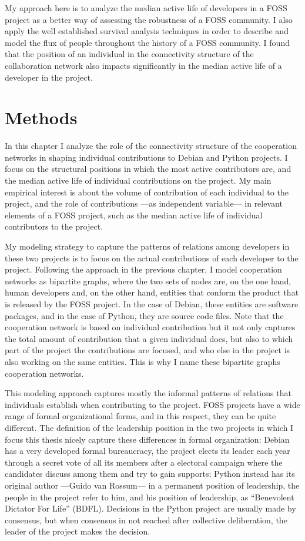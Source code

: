 My approach here is to analyze the median active life of developers in a FOSS project as a better way of assessing the robustness of a FOSS community. I also apply the well established survival analysis techniques \citep{miller:2011} in order to describe and model the flux of people throughout the history of a FOSS community.  I found that the position of an individual in the connectivity structure of the collaboration network also impacts significantly in the median active life of a developer in the project.

\section{Methods}

In this chapter I analyze the role of the connectivity structure of the cooperation networks in shaping individual contributions to Debian and Python projects. I focus on the structural positions in which the most active contributors are, and the median active life of individual contributions on the project. My main empirical interest is about the volume of contribution of each individual to the project, and the role of contributions ---as independent variable--- in relevant elements of a FOSS project, such as the median active life of individual contributors to the project.

My modeling strategy to capture the patterns of relations among developers in these two projects is to focus on the actual contributions of each developer to the project. Following the approach in the previous chapter, I model cooperation networks as bipartite graphs, where the two sets of nodes are, on the one hand, human developers and, on the other hand, entities that conform the product that is released by the FOSS project. In the case of Debian, these entities are software packages, and in the case of Python, they are source code files. Note that the cooperation network is based on individual contribution but it not only captures the total amount of contribution that a given individual does, but also to which part of the project the contributions are focused, and who else in the project is also working on the same entities. This is why I name these bipartite graphs cooperation networks.

This modeling approach captures mostly the informal patterns of relations that individuals establish when contributing to the project. FOSS projects have a wide range of formal organizational forms, and in this respect, they can be quite different. The definition of the leadership position in the two projects in which I focus this thesis nicely capture these differences in formal organization: Debian has a very developed formal bureaucracy, the project elects its leader each year through a secret vote of all its members after a electoral campaign where the candidates discuss among them and try to gain supports; Python instead has its original author ---Guido van Rossum--- in a permanent position of leadership, the people in the project refer to him, and his position of leadership, as ``Benevolent Dictator For Life'' (BDFL). Decisions in the Python project are usually made by consensus, but when consensus in not reached after collective deliberation, the leader of the project makes the decision. 

